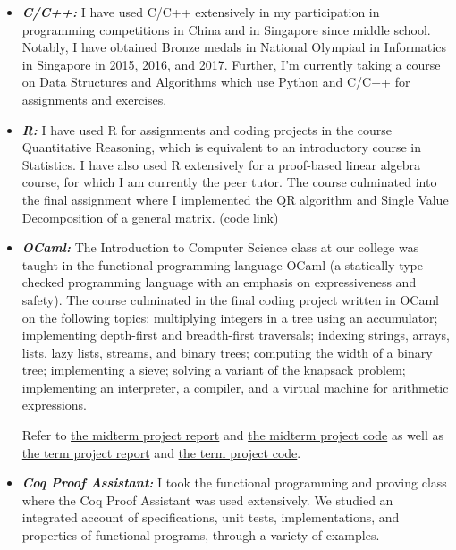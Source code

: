 \documentclass[11pt,reqno,oneside,a4paper]{article}
\begin{document}
\begin{itemize}
	\item \emph{\textbf{C/C++:}}
	I have used C/C++ extensively in my participation in programming competitions in China and in Singapore since middle school. Notably, I have obtained Bronze medals in National Olympiad in Informatics in Singapore in 2015, 2016, and 2017. Further, I’m currently taking a course on Data Structures and Algorithms which use Python and C/C++ for assignments and exercises. 
	
	\item \emph{\textbf{R:}}
	I have used R for assignments and coding projects in the course Quantitative Reasoning, which is equivalent to an introductory course in Statistics. I have also used R extensively for a proof-based linear algebra course, for which I am currently the peer tutor. The course culminated into the final assignment where I implemented the QR algorithm and Single Value Decomposition of a general matrix. (\href{https://github.com/zhangliu6/course-submissions/blob/main/Coding1-5.zip}{code link})
	
	\item \emph{\textbf{OCaml:}}
	The Introduction to Computer Science class at our college was taught in the functional programming language OCaml (a statically type-checked programming language with an emphasis on expressiveness and safety). The course culminated in the final coding project written in OCaml on the following topics: multiplying integers in a tree using an accumulator; implementing depth-first and breadth-first traversals; indexing strings, arrays, lists, lazy lists, streams, and binary trees; computing the width of a binary tree; implementing a sieve; solving a variant of the knapsack problem; implementing an interpreter, a compiler, and a virtual machine for arithmetic expressions. 
	
	Refer to \href{https://github.com/zhangliu6/course-submissions/blob/main/Intro_to_CS_Midterm%20(7).pdf}{the midterm project report} and \href{https://github.com/zhangliu6/course-submissions/blob/main/midterm-codes.zip}{the midterm project code} as well as \href{https://github.com/zhangliu6/course-submissions/blob/main/Term%20Project.pdf}{the term project report} and \href{https://github.com/zhangliu6/course-submissions/blob/main/final-codes.zip}{the term project code}.
		
	\item \emph{\textbf{Coq Proof Assistant: }}
	I took the functional programming and proving class where the Coq Proof Assistant was used extensively. We studied an integrated account of specifications, unit tests, implementations, and properties of functional programs, through a variety of examples. 
	

\end{itemize}
\end{document}
